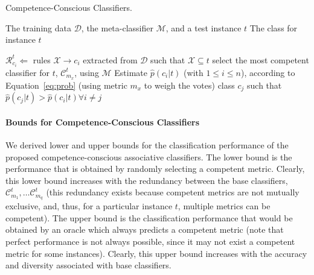 \begin{algorithm} [htp]
\caption{Competence-Conscious Classifiers.}
\begin{algorithmic}[1]
\REQUIRE The training data $\mathcal{D}$, the meta-classifier $\mathcal{M}$, and a test instance $t$
\ENSURE The class for instance $t$

\medskip

\STATE $\mathcal{R}^{t}_{c_i}\Leftarrow$ rules $\mathcal{X}\xrightarrow{}c_i$ extracted from $\mathcal{D}$ such that $\mathcal{X}\subseteq t$
\ENDFOR
\STATE select the most competent classifier for $t$, $\mathcal{C}^t_{m_x}$, using $\mathcal{M}$
\STATE Estimate $\hat{p}(c_i|t)$ (with $1$$\le$$i$$\le$$n$), according to Equation~\ref{eq:prob} (using metric $m_x$ to weigh the votes)
 class $c_j$ such that $\hat{p}(c_j|t)>\hat{p}(c_i|t)\forall i\ne j$

\end{algorithmic}
\label{alg:competence}
\end{algorithm}

\paragraph*{Bounds for Competence-Conscious Classifiers} We derived lower and upper bounds for the classification performance of the proposed competence-conscious associative classifiers. The lower bound is the performance that is obtained by randomly selecting a competent metric. Clearly, this lower bound increases with the redundancy between the base classifiers, $\mathcal{C}^t_{m_1},\ldots\mathcal{C}^t_{m_q}$ (this redundancy exists because competent metrics are not mutually exclusive, and, thus, for a particular instance $t$, multiple metrics can be competent).
The upper bound is the classification performance that would be obtained by an oracle which always predicts a competent metric (note that perfect performance is not always possible, since it may not exist a competent metric for some instances). Clearly, this upper bound increases with the accuracy and diversity associated with base classifiers.
